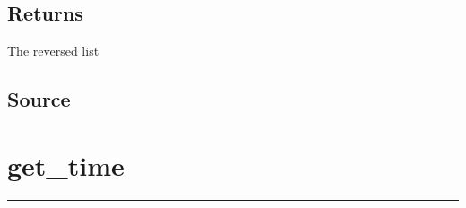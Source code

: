 \documentclass[letterpaper,10pt,english]{sphinxmanual}
\begin{document}
\subsection{Returns}
\label{\detokenize{OUP/reverse:returns}}
\sphinxAtStartPar
{}

\sphinxAtStartPar
The reversed list


\subsection{Source}
\label{\detokenize{OUP/reverse:source}}
\begin{sphinxVerbatim}[commandchars=\\\{\}]
 

        \PYG{p}{[}\PYG{p}{]}
           
                \PYG{p}{[}\PYG{p}{]}
         
\end{sphinxVerbatim}

\sphinxstepscope

\newpage
\section{get\_time}
\label{\detokenize{OUP/get_time:get-time}}\label{\detokenize{OUP/get_time::doc}}
\begin{sphinxVerbatim}[commandchars=\\\{\}]
 
\end{sphinxVerbatim}


\bigskip\hrule\bigskip
\end{document}
